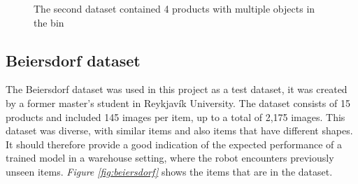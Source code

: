 \begin{figure}[h]
 \hfill
 \hfill
 \hfill
 
 \caption{The second dataset contained 4 products with multiple objects in the bin}
 \label{figure: multiproducts}
\end{figure}

\subsection{Beiersdorf dataset}\label{sec:beiersdorfdataset}
The Beiersdorf dataset\cite{bjarnason_detecting_2021} was used in this project as a test dataset, it was created by a former master's student in Reykjavík University. 
The dataset consists of 15 products and included 145 images per item, up to a total of 2,175 images. This dataset was diverse, with similar items and also items that have different shapes. It should therefore provide a good indication of the expected performance of a trained model in a warehouse setting, where the robot encounters previously unseen items. \textit{Figure \ref{fig:beiersdorf}} shows the items that are in the dataset.


